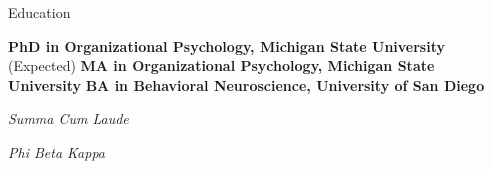 \begin{rubric}{Education}

\entry*[2020]%
	\textbf{PhD in Organizational Psychology, Michigan State University} (Expected)
%
\entry*[2019]%
	\textbf{MA in Organizational Psychology, Michigan State University}
%
%
\entry*[2016]%
	\textbf{BA in Behavioral Neuroscience, University of San Diego}\par
	\emph{Summa Cum Laude}\par
	\emph{Phi Beta Kappa}
%
\end{rubric}

